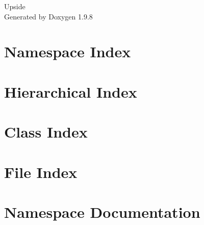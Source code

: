 \documentclass[twoside]{book}
\newcommand{\+}{\discretionary{\mbox{\scriptsize$\hookleftarrow$}}{}{}}
\newcommand{\clearemptydoublepage}{%
    \newpage{\pagestyle{empty}\cleardoublepage}%
  }
\begin{document}
  \raggedbottom
    \hypersetup{pageanchor=false,
                bookmarksnumbered=true,
                pdfencoding=unicode
               }
  \begin{titlepage}
  \vspace*{7cm}
  \begin{center}%
  {\Large Upside}\\
  \vspace*{1cm}
  {\large Generated by Doxygen 1.9.8}\\
  \end{center}
  \end{titlepage}
  \clearemptydoublepage
  \tableofcontents
  \clearemptydoublepage
  \hypersetup{pageanchor=true}
\chapter{Namespace Index}

\chapter{Hierarchical Index}

\chapter{Class Index}

\chapter{File Index}

\chapter{Namespace Documentation}


\end{document}
